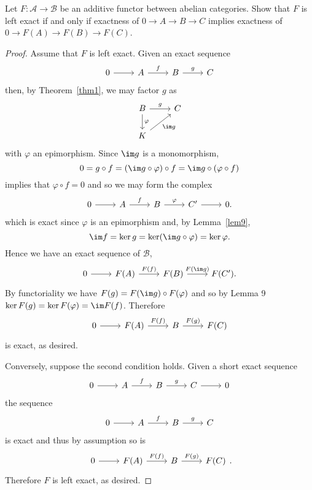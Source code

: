 \documentclass[10pt]{amsart}
\begin{document}
\begin{ex}
  Let $F : \mathcal{A} \rightarrow \mathcal{B}$ be an additive functor between abelian categories.
  Show that $F$ is left exact if and only if exactness of $0 \rightarrow A \rightarrow B \rightarrow C$ implies exactness of $0 \rightarrow F(A) \rightarrow F(B) \rightarrow F(C)$.

  \begin{proof}
    Assume that $F$ is left exact.
    Given an exact sequence
    $$\begin{tikzcd}
      0 \arrow{r} & A \arrow{r}{f} & B \arrow{r}{g} & C
    \end{tikzcd}$$
    then, by Theorem~\ref{thm1}, we may factor $g$ as
    $$\begin{tikzcd}
      B \arrow{d}{\varphi}\arrow{r}{g} & C\\
      K \arrow[swap]{ur}{\im g}
    \end{tikzcd}$$
    with $\varphi$ an epimorphism.
    Since $\im g$ is a monomorphism,
    $$0 = g \circ f = (\im g \circ \varphi) \circ f = \im g \circ (\varphi \circ f)$$
    implies that $\varphi \circ f = 0$ and so we may form the complex
    $$\begin{tikzcd}
      0 \arrow{r} & A \arrow{r}{f} & B \arrow{r}{\varphi} & C^\prime \arrow{r} & 0.
    \end{tikzcd}$$
    which is exact since $\varphi$ is an epimorphism and, by Lemma~\ref{lem9},
    $$\im f = \ker g = \ker(\im g \circ \varphi) = \ker \varphi.$$
    Hence we have an exact sequence of $\mathcal{B}$, 
    $$\begin{tikzcd}
      0 \arrow{r} & F(A) \arrow{r}{F(f)} & F(B) \arrow{r}{F(\im g)} & F(C^\prime).
    \end{tikzcd}$$
    By functoriality we have $F(g) = F(\im g) \circ F(\varphi)$ and so by Lemma 9 $\ker F(g) = \ker F(\varphi) = \im F(f)$.
    Therefore
    $$\begin{tikzcd}
      0 \arrow{r} & F(A) \arrow{r}{F(f)} & B \arrow{r}{F(g)} & F(C)
    \end{tikzcd}$$
    is exact, as desired.

    Conversely, suppose the second condition holds.
    Given a short exact sequence
    $$\begin{tikzcd}
      0 \arrow{r} & A \arrow{r}{f} & B \arrow{r}{g} & C\arrow{r} & 0
    \end{tikzcd}$$
    the sequence
    $$\begin{tikzcd}
      0 \arrow{r} & A \arrow{r}{f} & B \arrow{r}{g} & C
    \end{tikzcd}$$
    is exact and thus by assumption so is
    $$\begin{tikzcd}
      0 \arrow{r} & F(A) \arrow{r}{F(f)} & B \arrow{r}{F(g)} & F(C)
    \end{tikzcd}.$$
    Therefore $F$ is left exact, as desired.
  \end{proof}
\end{ex}
\end{document}
